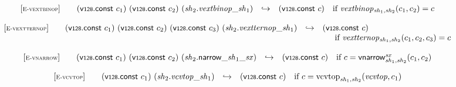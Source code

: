 \vspace{1ex}

$$
\begin{array}[t]{@{}lrcl@{}l@{}}
{[\textsc{\scriptsize E{-}vextbinop}]} \quad & (\mathsf{v{\scriptstyle 128}}{.}\mathsf{const}~c_1)~(\mathsf{v{\scriptstyle 128}}{.}\mathsf{const}~c_2)~({\mathit{sh}}_2 {.} {{\mathit{vextbinop}}}{\mathsf{\_}}{{\mathit{sh}}_1}) & \hookrightarrow & (\mathsf{v{\scriptstyle 128}}{.}\mathsf{const}~c) & \quad \mbox{if}~ {{\mathit{vextbinop}}}{{}_{{\mathit{sh}}_1, {\mathit{sh}}_2}(c_1, c_2)} = c \\
\end{array}
$$

\vspace{1ex}

$$
\begin{array}[t]{@{}lrcl@{}l@{}}
{[\textsc{\scriptsize E{-}vextternop}]} \quad & (\mathsf{v{\scriptstyle 128}}{.}\mathsf{const}~c_1)~(\mathsf{v{\scriptstyle 128}}{.}\mathsf{const}~c_2)~(\mathsf{v{\scriptstyle 128}}{.}\mathsf{const}~c_3)~({\mathit{sh}}_2 {.} {{\mathit{vextternop}}}{\mathsf{\_}}{{\mathit{sh}}_1}) & \hookrightarrow & (\mathsf{v{\scriptstyle 128}}{.}\mathsf{const}~c) &  \\
&&& \multicolumn{2}{@{}l@{}}{\quad
\quad \mbox{if}~ {{\mathit{vextternop}}}{{}_{{\mathit{sh}}_1, {\mathit{sh}}_2}(c_1, c_2, c_3)} = c
} \\
\end{array}
$$

\vspace{1ex}

$$
\begin{array}[t]{@{}lrcl@{}l@{}}
{[\textsc{\scriptsize E{-}vnarrow}]} \quad & (\mathsf{v{\scriptstyle 128}}{.}\mathsf{const}~c_1)~(\mathsf{v{\scriptstyle 128}}{.}\mathsf{const}~c_2)~({{\mathit{sh}}_2{.}\mathsf{narrow}}{\mathsf{\_}}{{\mathit{sh}}_1}{\mathsf{\_}}{{\mathit{sx}}}) & \hookrightarrow & (\mathsf{v{\scriptstyle 128}}{.}\mathsf{const}~c) & \quad \mbox{if}~ c = {\mathsf{vnarrow}}{{{}_{{\mathit{sh}}_1, {\mathit{sh}}_2}^{{\mathit{sx}}}}}{(c_1, c_2)} \\
\end{array}
$$

\vspace{1ex}

$$
\begin{array}[t]{@{}lrcl@{}l@{}}
{[\textsc{\scriptsize E{-}vcvtop}]} \quad & (\mathsf{v{\scriptstyle 128}}{.}\mathsf{const}~c_1)~({\mathit{sh}}_2 {.} {{\mathit{vcvtop}}}{\mathsf{\_}}{{\mathit{sh}}_1}) & \hookrightarrow & (\mathsf{v{\scriptstyle 128}}{.}\mathsf{const}~c) & \quad \mbox{if}~ c = {{\mathrm{vcvtop}}}_{{\mathit{sh}}_1, {\mathit{sh}}_2}({\mathit{vcvtop}}, c_1) \\
\end{array}
$$

